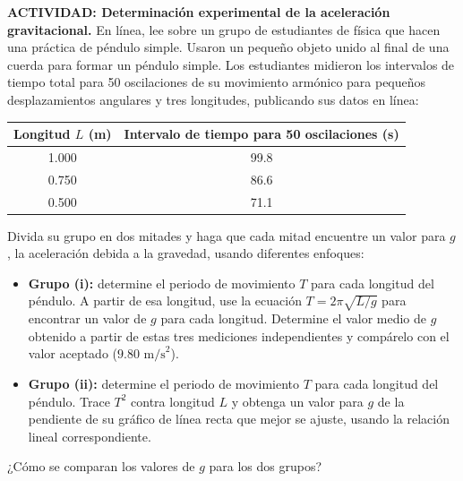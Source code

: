 \item \textbf{ACTIVIDAD: Determinación experimental de la aceleración gravitacional.}
En línea, lee sobre un grupo de estudiantes de física que hacen una práctica de péndulo simple. Usaron un pequeño objeto unido al final de una cuerda para formar un péndulo simple. Los estudiantes midieron los intervalos de tiempo total para 50 oscilaciones de su movimiento armónico para pequeños desplazamientos angulares y tres longitudes, publicando sus datos en línea:

\begin{center}
\begin{tabular}{|c|c|}
\hline
\textbf{Longitud $L$ (m)} & \textbf{Intervalo de tiempo para 50 oscilaciones (s)} \\ \hline
1.000 & 99.8 \\ \hline
0.750 & 86.6 \\ \hline
0.500 & 71.1 \\ \hline
\end{tabular}
\end{center}

Divida su grupo en dos mitades y haga que cada mitad encuentre un valor para $g$, la aceleración debida a la gravedad, usando diferentes enfoques:
\begin{itemize}
    \item \textbf{Grupo (i):} determine el periodo de movimiento $T$ para cada longitud del péndulo. A partir de esa longitud, use la ecuación $T = 2\pi\sqrt{L/g}$ para encontrar un valor de $g$ para cada longitud. Determine el valor medio de $g$ obtenido a partir de estas tres mediciones independientes y compárelo con el valor aceptado ($9.80\text{ m/s}^2$).
    \item \textbf{Grupo (ii):} determine el periodo de movimiento $T$ para cada longitud del péndulo. Trace $T^2$ contra longitud $L$ y obtenga un valor para $g$ de la pendiente de su gráfico de línea recta que mejor se ajuste, usando la relación lineal correspondiente.
\end{itemize}
¿Cómo se comparan los valores de $g$ para los dos grupos?